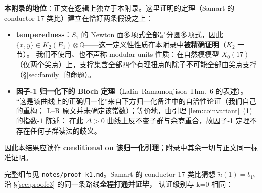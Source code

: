 \documentclass[11pt,a4paper]{ctexart}
\theoremstyle{remark}
\newcommand{\QQ}{\mathbb{Q}}
\begin{document}
\textbf{本附录的地位}：正文在逻辑上独立于本附录。这里证明的定理（Samart 的 conductor-17
类比）建立在恰好两条假设之上：
\begin{itemize}[nosep]
  \item \textbf{temperedness}：$S_1$ 的 Newton 面多项式全部是分圆多项式，因此
  $\{x,y\}\in K_2(E_1)\otimes\QQ$——这一定义性性质在本附录中\textbf{被精确证明}（$K_2$ 一节）。
  我们\textbf{不}使用、也\textbf{不}声称 modular-units 性质：在自然模模型 $X_0(17)$
  （仅两个尖点）上，支撑集含全部四个有理扭点的除子不可能全部由尖点支撑
  （\S\ref{sec:family} 的命题）。
  \item \textbf{因子-1 归一化下的 Bloch 定理}（Lal\'in--Ramamonjisoa Thm.~6 的表述）。
  ``这是该曲线上的正确归一化''来自下方归一化备注中的自洽性论证（我们自己的重构；
  L--R 原文并未确定该常数）；等价地，由引理 \ref{lem:coinvariant}~(1) 的指数-$1$ 陈述：
  在此 $\Delta>0$ 曲线上反不变子群与余商重合，故因子-1 定理不存在任何子群读法的歧义。
\end{itemize}
因此本结果应读作 \textbf{conditional on 该归一化引理}；附录中其余一切与正文同一标准证明。

完整细节见 \texttt{notes/proof-k1.md}。Samart 的 conductor-17 类比猜想
$\tilde n(1)=b_{17}$ 沿 \S\ref{sec:proofc3} 的同一条路线\textbf{全程打通并证毕}，
认证级别与 k=0 相同：
\end{document}

